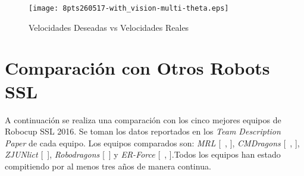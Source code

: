 




\begin{sidewaysfigure}
	\centering
		\texttt{[image: 8pts260517-with\_vision-multi-theta.eps]}
	\caption{Velocidades Deseadas vs Velocidades Reales}
	\label{fig:orient_vision_multi}
\end{sidewaysfigure}


\section{Comparación con Otros Robots SSL}
A continuación se realiza una comparación con los cinco mejores equipos de Robocup \gls{SSL} 2016. Se toman los datos reportados en los \textit{Team Description Paper} de cada equipo. Los equipos comparados son: \textit{MRL} [~\cite{poudeh2016mrl}, \cite{adhami2012mrl}], \textit{CMDragons} [~\cite{biswas2013cmdragons}, \cite{zickler2010cmdragons}], \textit{ZJUNlict} [~\cite{zhao2013zjunlict}], \textit{Robodragons} [~\cite{adachi2016robodragons}] y \textit{ER-Force} [~\cite{er-force-2016}, \cite{tdp-er-2014}].Todos los equipos han estado compitiendo por al menos tres años de manera continua.

